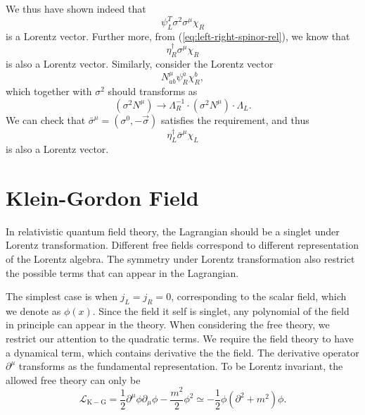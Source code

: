 We thus have shown indeed that
\begin{equation}
	\psi_L^T \sigma^2 \sigma^\mu \chi_R
\end{equation}
is a Lorentz vector.
Further more, from (\ref{eq:left-right-spinor-rel}), we know that
\begin{equation}
	\eta_R^\dagger \sigma^\mu \chi_R
\end{equation}
is also a Lorentz vector.
Similarly, consider the Lorentz vector 
\begin{equation*}
	N^\mu_{\dot a b} \psi^{\dot a}_R \chi^{b}_R,
\end{equation*}
which together with $\sigma^2$ should transforms as
\begin{equation*}
	\left(\sigma^2 N^\mu\right) \longrightarrow 
	\Lambda_R^{-1} \cdot \left(\sigma^2 N^\mu\right)\cdot \Lambda_L.
\end{equation*}
We can check that $\bar\sigma^\mu = (\sigma^0,-\vec\sigma)$ satisfies the requirement, and thus 
\begin{equation}
	\eta_L^\dagger \bar\sigma^\mu \chi_L
\end{equation}
is also a Lorentz vector.


\section{Klein-Gordon Field}

In relativistic quantum field theory, the Lagrangian should be a singlet under Lorentz transformation.
Different free fields correspond to different representation of the Lorentz algebra.
The symmetry under Lorentz transformation also restrict the possible terms that can appear in the Lagrangian.


The simplest case is when $j_L=j_R = 0$, corresponding to the scalar field, which we denote as $\phi(x)$.
Since the field it self is singlet, any polynomial of the field in principle can appear in the theory.
When considering the free theory, we restrict our attention to the quadratic terms.
We require the field theory to have a dynamical term, which contains derivative the the field.
The derivative operator $\partial^\mu$ transforms as the fundamental representation.
To be Lorentz invariant, the allowed free theory can only be
\begin{equation}
	\mathcal L_{\mathrm{K-G}} = \frac{1}{2}\partial^\mu \phi \partial_\mu \phi -\frac{m^2}{2}\phi^2 
	\simeq -\frac{1}{2}\phi (\partial^2+m^2) \phi.
\end{equation}

